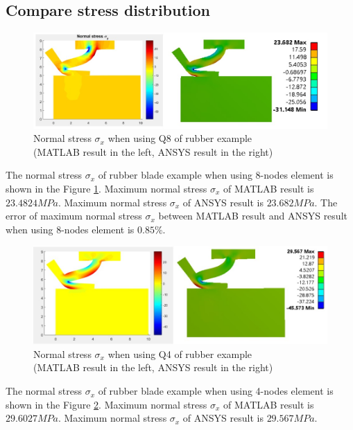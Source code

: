 \subsection{Compare stress distribution}
\begin{figure}[H]
    \centering
    \includegraphics[scale=0.625]{Figures/sx_rub_MvsA.jpg}
    \decoRule
    \caption{Normal stress $\sigma_x$ when using Q8 of rubber example \\
    (MATLAB result in the left, ANSYS result in the right)}
    \label{fig:sx_rub_MandA_5}
\end{figure}
\noindent
The normal stress $\sigma_x$ of rubber blade example when using 8-nodes element is shown in the Figure \ref{fig:sx_rub_MandA_5}.
Maximum normal stress $\sigma_x$ of MATLAB result is $23.4824 MPa$.
Maximum normal stress $\sigma_x$ of ANSYS result is $23.682 MPa$.
The error of maximum normal stress $\sigma_x$ between MATLAB result and ANSYS result when using 8-nodes element is $0.85\%$.
\newline
\begin{figure}[H]
    \centering
    \includegraphics[scale=0.65]{Figures/chapter5/sx_q4_r.jpg}
    \decoRule
    \caption{Normal stress $\sigma_x$ when using Q4 of rubber example \\
    (MATLAB result in the left, ANSYS result in the right)}
    \label{fig:sx_q4_r}
\end{figure}
\noindent
The normal stress $\sigma_x$ of rubber blade example when using 4-nodes element is shown in the Figure \ref{fig:sx_q4_r}.
Maximum normal stress $\sigma_x$ of MATLAB result is $29.6027 MPa$.
Maximum normal stress $\sigma_x$ of ANSYS result is $29.567 MPa$.
